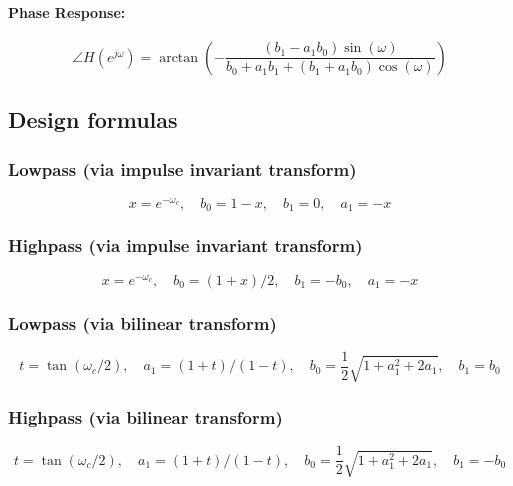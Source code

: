 \paragraph{Phase Response:}
\begin{equation}
 \angle H(e^{j \omega}) = \arctan \left( - \frac{ (b_1 - a_1 b_0) \sin(\omega) } { b_0 + a_1 b_1 + ( b_1 + a_1 b_0) \cos(\omega) }  \right)
\end{equation}



\subsection{Design formulas}

\subsubsection{Lowpass (via impulse invariant transform)}
\begin{equation}
  x = e^{-\omega_c}, \quad b_0 = 1-x, \quad b_1 = 0, \quad a_1 = -x
\end{equation}

\subsubsection{Highpass (via impulse invariant transform)}
\begin{equation}
  x = e^{-\omega_c}, \quad b_0 = (1+x)/2, \quad b_1 = -b_0, \quad a_1 = -x
\end{equation}

\subsubsection{Lowpass (via bilinear transform)}
\begin{equation}
  t = \tan( \omega_c / 2 ), \quad a_1 = (1+t)/(1-t), \quad b_0 = \frac{1}{2} \sqrt{1+a_1^2+2a_1}, \quad b_1 = b_0
\end{equation}

\subsubsection{Highpass (via bilinear transform)}
\begin{equation}
  t = \tan( \omega_c / 2 ), \quad a_1 = (1+t)/(1-t), \quad b_0 = \frac{1}{2} \sqrt{1+a_1^2+2a_1}, \quad b_1 = -b_0
\end{equation}

